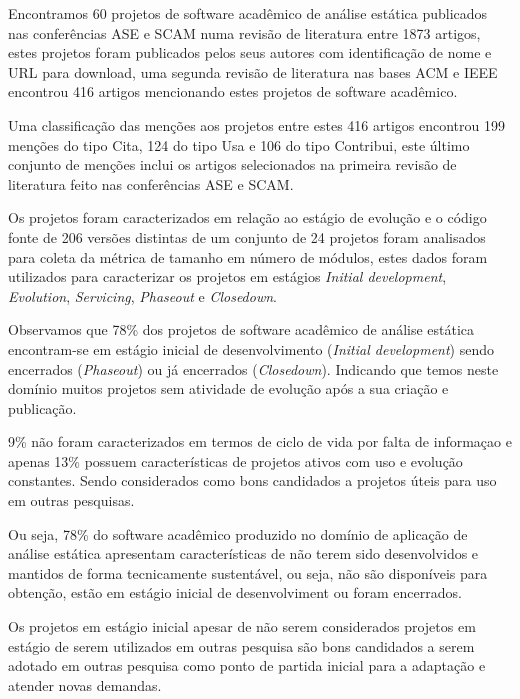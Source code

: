 \label{conclusoes}


Encontramos 60 projetos de software acadêmico de análise estática publicados
nas conferências ASE e SCAM numa revisão de literatura entre 1873 artigos,
estes projetos foram publicados pelos seus autores com identificação de nome e
URL para download, uma segunda revisão de literatura nas bases ACM e IEEE
encontrou 416 artigos mencionando estes projetos de software acadêmico.

Uma classificação das menções aos projetos entre estes 416 artigos encontrou
199 menções do tipo Cita, 124 do tipo Usa e 106 do tipo Contribui, este último
conjunto de menções inclui os artigos selecionados na primeira revisão de literatura
feito nas conferências ASE e SCAM.

Os projetos foram caracterizados em relação ao estágio de evolução e o código
fonte de 206 versões distintas de um conjunto de 24 projetos foram analisados
para coleta da métrica de tamanho em número de módulos, estes dados foram
utilizados para caracterizar os projetos em estágios {\it Initial development},
{\it Evolution}, {\it Servicing}, {\it Phaseout} e {\it Closedown}.

Observamos que 78\% dos projetos de software acadêmico de análise estática
encontram-se em estágio inicial de desenvolvimento ({\it Initial development})
sendo encerrados ({\it Phaseout}) ou já encerrados ({\it Closedown}). Indicando
que temos neste domínio muitos projetos sem atividade de evolução após a sua
criação e publicação.

9\% não foram caracterizados em termos de ciclo de vida por falta de informaçao
e apenas 13\% possuem características de projetos ativos com uso e evolução
constantes. Sendo considerados como bons candidados a projetos úteis para uso
em outras pesquisas.

Ou seja, 78\% do software acadêmico produzido no domínio de aplicação de
análise estática apresentam características de não terem sido desenvolvidos e
mantidos de forma tecnicamente sustentável, ou seja, não são disponíveis para
obtenção, estão em estágio inicial de desenvolviment ou foram encerrados.

Os projetos em estágio inicial apesar de não serem considerados projetos em
estágio de serem utilizados em outras pesquisa são bons candidados a serem
adotado em outras pesquisa como ponto de partida inicial para a adaptação e
atender novas demandas.

